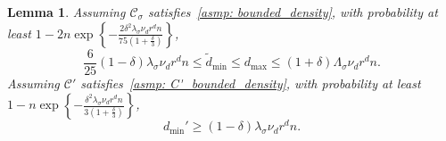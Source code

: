 \documentclass[11pt,twoside]{article}
\newtheorem{lemma}{Lemma}
\theoremstyle{definition}
\newcommand{\set}[1]{\left\{#1\right\}}
\newcommand{\1}{\mathbbm{1}}
\newcommand{\Cset}{\mathcal{C}}
\newcommand{\Csig}{\Cset_{\sigma}}
\newcommand{\degminpr}{d_{\min}'}
\newcommand{\degminwt}{\widetilde{d}_{\min}}
\begin{document}
\begin{lemma}
	\noindent Assuming $\Csig$ satisfies~\ref{asmp: bounded_density}, with probability at least $1 - 2n\exp\set{-\frac{2 \delta^2 \lambda_{\sigma} \nu_d r^d n}{75(1 + \frac{\delta}{3})}}$,
	\begin{equation}
	\label{eqn:degwt_bound}
	\frac{6}{25}(1 - \delta)\lambda_{\sigma}\nu_dr^dn \leq \degminwt \leq d_{\max} \leq (1 + \delta) \Lambda_{\sigma} \nu_dr^dn.
	\end{equation}
	Assuming $\Cset'$ satisfies~\ref{asmp: C'_bounded_density}, with probability at least $1 - n\exp\set{-\frac{\delta^2 \lambda_{\sigma} \nu_d r^d n}{3(1 + \frac{\delta}{3})}}$,
	\begin{equation}
	\label{eqn:degpr_bound}
	\degminpr \geq (1 - \delta)\lambda_{\sigma}\nu_dr^dn.
	\end{equation}
\end{lemma}
\end{document}
